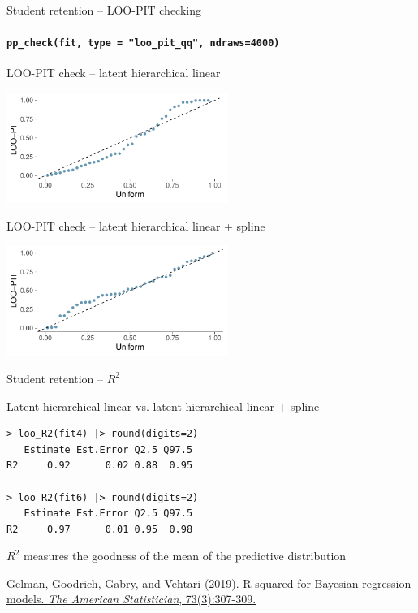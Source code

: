 \documentclass[english,t]{beamer}
\begin{document}
\begin{frame}[fragile]{Student retention -- LOO-PIT checking}
\framesubtitle{\texttt{pp\_check(fit, type = "loo\_pit\_qq", ndraws=4000)}}

\vspace{-0.5\baselineskip}  
LOO-PIT check -- latent hierarchical linear\\  
  \hspace{-7mm}
  \begin{minipage}[t][3.6cm][t]{1.0\linewidth}
    \includegraphics[height=3.6cm]{student_retention_lbinom_ppc_loo_pit_qq.pdf}
  \end{minipage}  

\vspace{-0.5\baselineskip}  
LOO-PIT check -- latent hierarchical linear + spline\\  
  \hspace{-7mm}
  \begin{minipage}[t][3.6cm][t]{1.0\linewidth}
    \includegraphics[height=3.6cm]{student_retention_sbinom_ppc_loo_pit_qq.pdf}
  \end{minipage}  

\end{frame}

\begin{frame}[fragile]{Student retention -- $R^2$}

Latent hierarchical linear vs. latent hierarchical linear + spline
  
{\small
\begin{lstlisting}
> loo_R2(fit4) |> round(digits=2)
   Estimate Est.Error Q2.5 Q97.5
R2     0.92      0.02 0.88  0.95

> loo_R2(fit6) |> round(digits=2)
   Estimate Est.Error Q2.5 Q97.5
R2     0.97      0.01 0.95  0.98
\end{lstlisting}}

  $R^2$ measures the goodness of the mean of the predictive
  distribution

  \vspace{4\baselineskip}
{\color{gray}\footnotesize \href{https://doi.org/10.1080/00031305.2018.1549100}{Gelman, Goodrich, Gabry, and Vehtari (2019). R-squared for Bayesian regression models. \textit{The American Statistician}, 73(3):307-309.}}
  
\end{frame}
\end{document}
